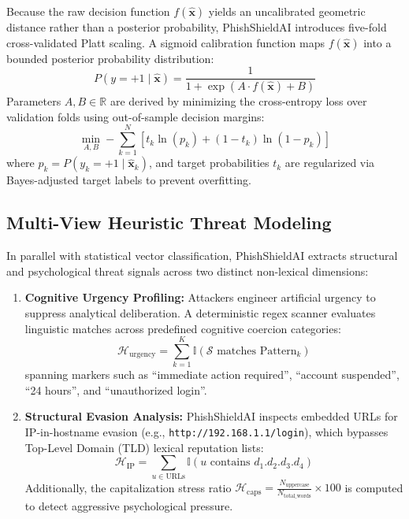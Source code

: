 \documentclass[conference]{IEEEtran}
\begin{document}
Because the raw decision function $f(\hat{\mathbf{x}})$ yields an uncalibrated geometric distance rather than a posterior probability, PhishShieldAI introduces five-fold cross-validated Platt scaling. A sigmoid calibration function maps $f(\hat{\mathbf{x}})$ into a bounded posterior probability distribution:
\begin{equation}
    P(y = +1 \mid \hat{\mathbf{x}}) = \frac{1}{1 + \exp(A \cdot f(\hat{\mathbf{x}}) + B)}
\end{equation}
Parameters $A, B \in \mathbb{R}$ are derived by minimizing the cross-entropy loss over validation folds using out-of-sample decision margins:
\begin{equation}
    \min_{A, B} -\sum_{k=1}^N \left[ t_k \ln(p_k) + (1 - t_k) \ln(1 - p_k) \right]
\end{equation}
where $p_k = P(y_k = +1 \mid \hat{\mathbf{x}}_k)$, and target probabilities $t_k$ are regularized via Bayes-adjusted target labels to prevent overfitting.

\subsection{Multi-View Heuristic Threat Modeling}
In parallel with statistical vector classification, PhishShieldAI extracts structural and psychological threat signals across two distinct non-lexical dimensions:
\begin{enumerate}
    \item \textbf{Cognitive Urgency Profiling:} Attackers engineer artificial urgency to suppress analytical deliberation. A deterministic regex scanner evaluates linguistic matches across predefined cognitive coercion categories:
    \begin{equation}
        \mathcal{H}_{\text{urgency}} = \sum_{k=1}^K \mathbb{I}\left(\mathcal{S} \text{ matches } \text{Pattern}_k\right)
    \end{equation}
    spanning markers such as ``immediate action required'', ``account suspended'', ``24 hours'', and ``unauthorized login''.
    \item \textbf{Structural Evasion Analysis:} PhishShieldAI inspects embedded URLs for IP-in-hostname evasion (e.g., \texttt{http://192.168.1.1/login}), which bypasses Top-Level Domain (TLD) lexical reputation lists:
    \begin{equation}
        \mathcal{H}_{\text{IP}} = \sum_{u \in \text{URLs}} \mathbb{I}\left(u \text{ contains } d_1.d_2.d_3.d_4\right)
    \end{equation}
    Additionally, the capitalization stress ratio $\mathcal{H}_{\text{caps}} = \frac{N_{\text{uppercase}}}{N_{\text{total\_words}}} \times 100$ is computed to detect aggressive psychological pressure.
\end{enumerate}
\end{document}
